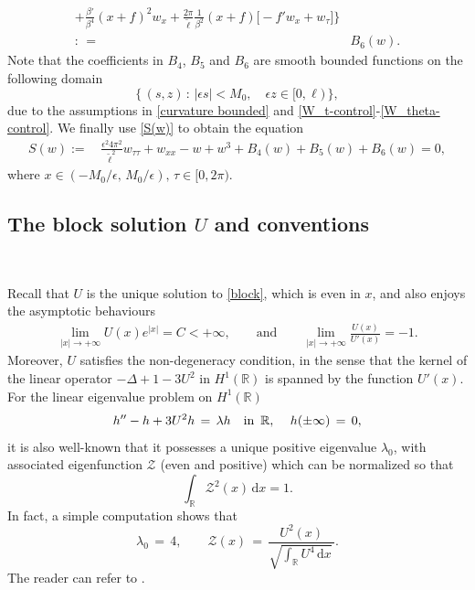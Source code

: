 \documentclass[10pt, reqno]{amsart}
\numberwithin{equation}{section}
\theoremstyle{definition}
\begin{document}
{\begin{align}
+\frac{\beta'}{\beta^4} (x+f)^2 w_{x}
+\frac{ 2\pi}{ {\tilde\ell}}\frac{1}{ \beta^2} (x+f)\big[-f'w_x +w_\tau\big]
\Bigg\}
\nonumber\\[2mm]
: \,=\,& B_6(w).
\label{B2w-2222new}
\end{align}
Note that the coefficients in $B_4$, $B_5$ and $B_6$ are smooth bounded functions on the following domain
$$
\Big\{\, (s, z)\, :\, |\epsilon s|<M_0, \quad \epsilon z\in [0, \ell)\, \Big\},
$$
due to the assumptions in \eqref{curvature bounded} and \eqref{W_t-control}-\eqref{W_theta-control}.
We finally use \eqref{S(w)} to obtain the equation
\begin{align}
S(w):=&\, \frac{\epsilon^2 4\pi^2}{{\tilde\ell}^2} w_{\tau\tau} + w_{xx} - w +w^3 + B_4(w)+ B_5(w)+ B_6(w)=0,
\label{problem-local4}
\end{align}
where $x\in(-M_0/\epsilon,\, M_0/\epsilon),\, \tau\in [0, 2\pi)$.


\subsection{ The block solution $U$ and conventions}\label{Section3.3}\

Recall that $U$ is the unique solution to \eqref{block}, which is even in $x$, and also enjoys the asymptotic behaviours
\begin{align}
 \lim_{|x| \rightarrow +\infty} U(x) e^{|x|} = C<+\infty,
\qquad\text{and} \qquad
\lim_{|x| \rightarrow +\infty} \frac{U(x)}{U'(x)}=-1.
\label{U-asymp}
\end{align}
Moreover, $U$ satisfies the non-degeneracy condition, in the sense that the kernel of the linear operator $-\Delta + 1 -3U^2 $ in $H^1(\mathbb{R}) $ is spanned by the function $U'(x)$.
For the linear eigenvalue problem on $H^1({\mathbb R})$
\begin{align}
\label{eigenvalue}
h{''}-h+3U^{2}h\,=\, \lambda h\quad \mbox{in }\,\Bbb R, \,\quad h(\pm \infty)\,=\, 0,
\end{align}
it is also well-known that it possesses a unique positive eigenvalue $\lambda_0$,
with associated eigenfunction ${\mathcal Z}$ (even and positive) which can be normalized so that
$$
\int_{{\mathbb R}}{\mathcal Z}^2(x) \,{\mathrm d}x=1.
$$
In fact, a simple computation shows that
\begin{equation}
\label{lambda0}
\lambda_0\,=\, 4,
\qquad
\mathcal Z(x)\,=\, \frac{U^{2}(x)}{\sqrt{\displaystyle\int_{\mathbb R} U^{4} \,{\mathrm d}x}\, }.
\end{equation}
The reader can refer to \cite{delPKowWei1}.

}
\end{document}
